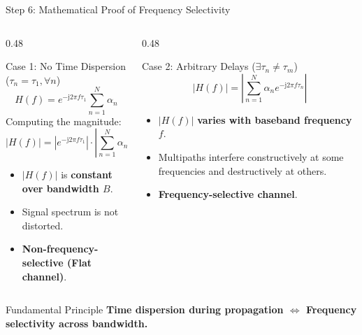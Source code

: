 \documentclass[10pt,aspectratio=169]{beamer}
\newcommand{\jj}{\mathrm{j}}
\begin{document}
\begin{frame}{Step 6: Mathematical Proof of Frequency Selectivity}
\small
  \begin{columns}[T]
    \begin{column}{0.48\textwidth}
      \begin{exampleblock}{Case 1: No Time Dispersion ($\tau_n = \tau_1, \forall n$)}
        \begin{equation}
          H(f) = e^{-\jj 2\pi f \tau_1} \sum_{n=1}^N \alpha_n
        \end{equation}
        Computing the magnitude:
        \begin{equation}
          |H(f)| = \left| e^{-\jj 2\pi f \tau_1} \right| \cdot \left| \sum_{n=1}^N \alpha_n \right| = \left| \sum_{n=1}^N \alpha_n \right|
        \end{equation}
        \begin{itemize}
          \item $|H(f)|$ is \textbf{constant over bandwidth $B$}.
          \item Signal spectrum is not distorted.
          \item \textbf{Non-frequency-selective (Flat channel)}.
        \end{itemize}
      \end{exampleblock}
    \end{column}

    \begin{column}{0.48\textwidth}
      \begin{alertblock}{Case 2: Arbitrary Delays ($\exists \tau_n \neq \tau_m$)}
        \begin{equation}
          |H(f)| = \left| \sum_{n=1}^{N} \alpha_n e^{-\jj 2\pi f \tau_n} \right|
        \end{equation}
        \begin{itemize}
          \item $|H(f)|$ \textbf{varies with baseband frequency $f$}.
          \item Multipaths interfere constructively at some frequencies and destructively at others.
          \item \textbf{Frequency-selective channel}.
        \end{itemize}
      \end{alertblock}
    \end{column}
  \end{columns}

  \begin{block}{Fundamental Principle}
    \centering
    \textbf{Time dispersion during propagation $\iff$ Frequency selectivity across bandwidth.}
  \end{block}
\end{frame}
\end{document}
